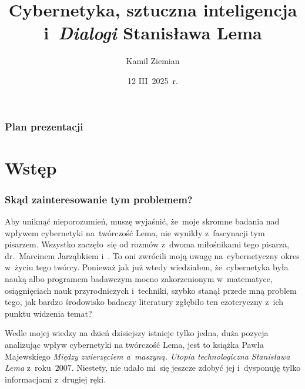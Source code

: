 \documentclass[10pt,t]{beamer}
\title{Cybernetyka, sztuczna inteligencja i~\textit{Dialogi}
  Stanisława Lema}
\author{Kamil Ziemian \\
  \email}
\date[12 III~2025~r.]{12 III~2025~r.}
\begin{document}





\RaggedRight





\maketitle





\begin{frame}
  \frametitle{Plan prezentacji}


  \tableofcontents

\end{frame}










\section{Wstęp}



\begin{frame}
  \frametitle{Skąd zainteresowanie tym problemem?}


  Aby uniknąć nieporozumień, muszę wyjaśnić, że~moje skromne badania nad
  wpływem cybernetyki na~twórczość Lema, nie wynikły z~fascynacji tym
  pisarzem. Wszystko zaczęło~się od rozmów z~dwoma miłośnikami tego pisarza,
  {dr.~Marcinem Jarząbkiem}
  i~. To oni zwrócili moją uwagę na~cybernetyczny okres w~życiu
  tego twórcy. Ponieważ jak już wtedy wiedziałem, że~cybernetyka była nauką
  albo programem badawczym mocno zakorzenionym w~matematyce, osiągnięciach
  nauk przyrodniczych i~techniki, szybko stanął przede mną problem tego,
  jak bardzo środowisko badaczy literatury zgłębiło ten ezoteryczny z~ich
  punktu widzenia temat?

  Wedle mojej wiedzy na dzień dzisiejszy istnieje tylko jedna, duża pozycja
  analizując wpływ cybernetyki na twórczość Lema, jest to książka Pawła
  Majewskiego \textit{Między zwierzęciem a~maszyną. Utopia technologiczna
    Stanisława Lema} z~roku~$2007$. Niestety, nie udało mi~się jeszcze
  zdobyć jej i~dysponuję tylko informacjami z~drugiej ręki.

\end{frame}
\end{document}
